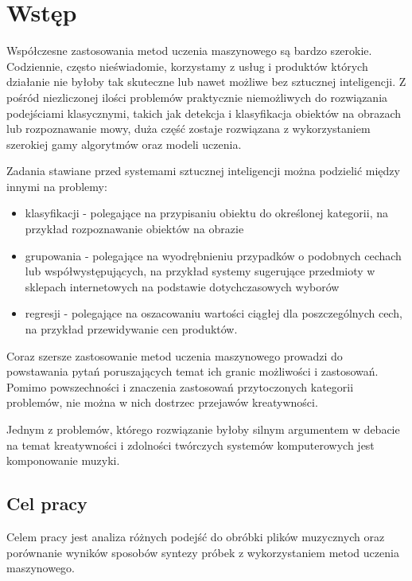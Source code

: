 
\chapter{Wstęp}
{
    Współczesne zastosowania metod uczenia maszynowego są bardzo szerokie. Codziennie, często nieświadomie,
    korzystamy z usług i produktów których działanie nie byłoby tak skuteczne lub nawet możliwe bez sztucznej inteligencji.
    Z pośród niezliczonej ilości problemów praktycznie niemożliwych do rozwiązania podejściami klasycznymi, 
    takich jak detekcja i klasyfikacja obiektów na obrazach lub rozpoznawanie mowy,
    duża część zostaje rozwiązana z wykorzystaniem szerokiej gamy algorytmów oraz modeli uczenia.

    Zadania stawiane przed systemami sztucznej inteligencji można podzielić między innymi na problemy:
    \begin{itemize}
        \item klasyfikacji - polegające na przypisaniu obiektu do określonej kategorii, 
        na przykład rozpoznawanie obiektów na obrazie 
        \item grupowania - polegające na wyodrębnieniu przypadków o podobnych cechach 
        lub współwystępujących, na przykład systemy sugerujące przedmioty w sklepach internetowych na podstawie dotychczasowych wyborów
        \item regresji - polegające na oszacowaniu wartości ciągłej dla poszczególnych cech, 
        na przykład przewidywanie cen produktów.
    \end{itemize}

    \pagebreak

    Coraz szersze zastosowanie metod uczenia maszynowego prowadzi do powstawania pytań poruszających temat 
    ich granic możliwości i zastosowań.
    Pomimo powszechności i znaczenia zastosowań przytoczonych kategorii problemów, nie można w nich dostrzec przejawów kreatywności.
    
    Jednym z problemów, którego rozwiązanie byłoby silnym argumentem w debacie na temat kreatywności i zdolności twórczych
    systemów komputerowych jest komponowanie muzyki.

    \section{Cel pracy}
    {
        Celem pracy jest analiza różnych podejść do obróbki plików muzycznych oraz 
        porównanie wyników sposobów syntezy próbek z wykorzystaniem metod uczenia maszynowego. 

}}
